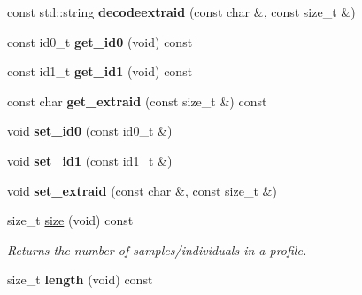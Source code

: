 \begin{DoxyCompactItemize}
\item 
\hypertarget{classprofile_a13ccbacd48d320e030d0cc03d194f9f1}{const std\-::string {\bfseries decodeextraid} (const char \&, const size\-\_\-t \&)}\label{classprofile_a13ccbacd48d320e030d0cc03d194f9f1}

\item 
\hypertarget{classprofile_a0853c220558c44c05d79ab36ef52574e}{const id0\-\_\-t {\bfseries get\-\_\-id0} (void) const }\label{classprofile_a0853c220558c44c05d79ab36ef52574e}

\item 
\hypertarget{classprofile_a7e34912e596c85e9ed009dbcb8397fab}{const id1\-\_\-t {\bfseries get\-\_\-id1} (void) const }\label{classprofile_a7e34912e596c85e9ed009dbcb8397fab}

\item 
\hypertarget{classprofile_aec71ea394f1b3a2a8b0fc3a4aed61275}{const char {\bfseries get\-\_\-extraid} (const size\-\_\-t \&) const }\label{classprofile_aec71ea394f1b3a2a8b0fc3a4aed61275}

\item 
\hypertarget{classprofile_a078097db4ed2a00fae79dec92f49945d}{void {\bfseries set\-\_\-id0} (const id0\-\_\-t \&)}\label{classprofile_a078097db4ed2a00fae79dec92f49945d}

\item 
\hypertarget{classprofile_a48af46e5b424550f7f097174c628e263}{void {\bfseries set\-\_\-id1} (const id1\-\_\-t \&)}\label{classprofile_a48af46e5b424550f7f097174c628e263}

\item 
\hypertarget{classprofile_a1cecb8c035e565b08753f5a6b43774b1}{void {\bfseries set\-\_\-extraid} (const char \&, const size\-\_\-t \&)}\label{classprofile_a1cecb8c035e565b08753f5a6b43774b1}

\item 
\hypertarget{classprofile_a3846fa0613b6ebba30e56c5348b3d7c8}{size\-\_\-t \hyperlink{classprofile_a3846fa0613b6ebba30e56c5348b3d7c8}{size} (void) const }\label{classprofile_a3846fa0613b6ebba30e56c5348b3d7c8}

\begin{DoxyCompactList}\small\item\em Returns the number of samples/individuals in a profile. \end{DoxyCompactList}\item 
\hypertarget{classprofile_aba469d3a6d2b978d588cd40b37c099fe}{size\-\_\-t {\bfseries length} (void) const }\label{classprofile_aba469d3a6d2b978d588cd40b37c099fe}


\end{DoxyCompactItemize}
